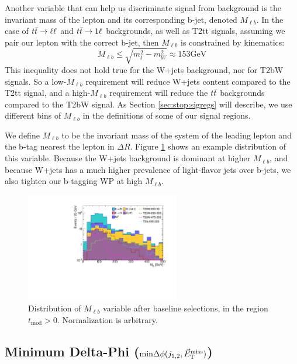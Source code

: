 Another variable that can help us discriminate signal from background
is the invariant mass of the lepton and its corresponding b-jet,
denoted $M_{\ell b}$. In the case of $t\bar{t} \rightarrow \ell\ell$ and $t\bar{t} \rightarrow 1\ell$
backgrounds, as well as T2tt signals, assuming we pair our lepton with
the correct b-jet, then $M_{\ell b}$ is constrained by kinematics:
\begin{equation}
M_{\ell b} \leq \sqrt{m_t^2 - m_W^2} \approx 153 \text{GeV} %
\end{equation}
This inequality does not hold true for the W+jets background, nor for T2bW
signals. So a low-$M_{\ell b}$ requirement will reduce W+jets content
compared to the T2tt signal, and a high-$M_{\ell b}$ requirement will reduce
the $t\bar{t}$ backgrounds compared to the T2bW signal. As Section
\ref{sec:stop:sigregs} will describe, we use different bins of
$M_{\ell b}$ in the definitions of some of our signal regions.

We define $M_{\ell b}$ to be the invariant mass of the system of the
leading lepton and the b-tag nearest the lepton in $\Delta R$. Figure
\ref{fig:stop:mlb} shows an example distribution of this
variable. Because the W+jets background is dominant at higher
$M_{\ell b}$, and because W+jets has a much higher prevalence of
light-flavor jets over b-jets, we also tighten our b-tagging WP at
high $M_{\ell b}$.

\begin{figure}
\centering
\includegraphics[width=0.6\textwidth]{figures/nminusone_mlb.pdf}
\caption{Distribution of $M_{\ell b}$ variable after baseline
  selections, in the region $t_\text{mod} > 0$. Normalization is arbitrary.}
\label{fig:stop:mlb}
\end{figure}

\subsection{Minimum Delta-Phi (\texorpdfstring{$\text{min}\Delta\phi(j_{1,2},\vec{E}_\text{T}^\text{miss})$}{minDphi})}
\label{ssec:stop:mindphi}

